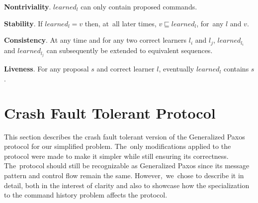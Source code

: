 \documentclass[algorithms,article,accept,moreauthors,pdftex,10pt,a4paper]{Definitions/mdpi}
\begin{document}
\textbf{Nontriviality}. $learned_l$ can only contain proposed commands. 

\textbf{Stability}. If $learned_l = v$ then, at~all later times, $v \sqsubseteq learned_l$, for~any $l$ and $v$. 

\textbf{Consistency}. At any time and for any two correct learners $l_i$ and $l_j$, $learned_{l_i}$ and $learned_{l_j}$ can subsequently be extended to equivalent sequences.

\textbf{Liveness}. For any proposal $s$ and correct learner $l$, eventually $learned_l$ contains $s$.

%
%
\section{Crash Fault Tolerant Protocol}
\label{sec:cft}
%

This section describes the crash fault tolerant version of the Generalized Paxos protocol for our simplified problem. The~only modifications applied to the protocol were made to make it simpler while still ensuring its correctness. The~protocol should still be recognizable as Generalized Paxos since its message pattern and control flow remain the same. However,~we~chose to describe it in detail, both in the interest of clarity and also to showcase how the specialization to the command history problem affects the protocol.
\end{document}
